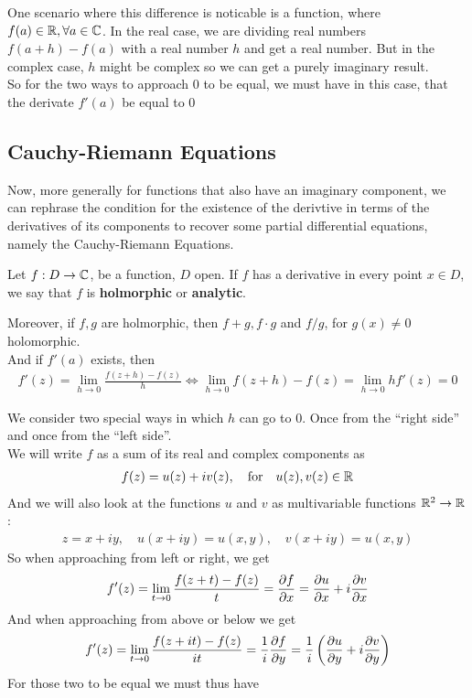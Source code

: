 One scenario where this difference is noticable is a function, where $f(a) \in \mathbb{R}, \forall a \in \mathbb{C}$. In the real case, we are dividing real numbers $f(a+h) - f(a)$ with a real number $h$ and get a real number. But in the complex case, $h$ might be complex so we can get a purely imaginary result.\\
So for the two ways to approach $0$ to be equal, we must have in this case, that the derivate $f'(a)$ be equal to $0$


\subsection{Cauchy-Riemann Equations}
Now, more generally for functions that also have an imaginary component, we can rephrase the condition for the existence of the derivtive in terms of the derivatives of its components to recover some partial differential equations, namely the Cauchy-Riemann Equations.


\begin{definition}
Let $f: D \to \mathbb{C}$, be a function, $D$ open. If $f$ has a derivative in every point $x \in D$, we say that $f$ is \textbf{holmorphic} or \textbf{analytic}.
\end{definition}
Moreover, if $f,g$ are holmorphic, then $f+g, f \cdot g$ and $f/g$, for $g(x) \neq 0$ holomorphic.\\
And if $f'(a)$ exists, then
\begin{align*}
				f'(z) = \lim_{h \to 0} \frac{f(z+h) - f(z)}{h} \Leftrightarrow \lim_{h \to 0}f(z+h) - f(z) = \lim_{h \to 0}hf'(z) = 0
\end{align*}

We consider two special ways in which $h$ can go to $0$. Once from the ``right side'' and once from the ``left side''.\\

We will write $f$ as a sum of its real and complex components as
\begin{align*}
				f(z) = u(z) + iv(z), \quad \text{for} \quad u(z),v(z) \in \mathbb{R}
\end{align*}
And we will also look at the functions $u$ and $v$ as multivariable functions $\mathbb{R}^2 \to \mathbb{R}$:
\begin{align*}
				z = x + iy, \quad u(x + iy) = u(x,y), \quad v(x+iy) = u(x,y)
\end{align*}
So when approaching from left or right, we get
\begin{align*}
				f'(z) = \lim_{t \to 0} \frac{f(z+t) - f(z)}{t} = \frac{\partial f}{\partial x} = \frac{\partial u}{\partial x} + i \frac{\partial v}{\partial x}
\end{align*}
And when approaching from above or below we get
\begin{align*}
				f'(z) = \lim_{t \to 0} \frac{f(z + it) - f(z)}{it} = \frac{1}{i} \frac{\partial f}{\partial y} = \frac{1}{i} \left(\frac{\partial u}{\partial y} + i\frac{\partial v}{\partial y}\right)
\end{align*}
For those two to be equal we must thus have

